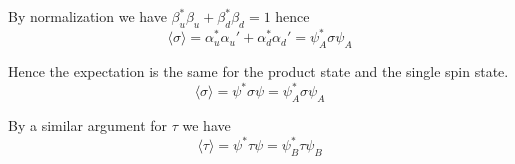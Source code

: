 \documentclass[12pt]{article}
\begin{document}
By normalization we have $\beta_u^*\beta_u+\beta_d^*\beta_d=1$ hence
\begin{equation*}
\langle\sigma\rangle=\alpha_u^*\alpha_u'+\alpha_d^*\alpha_d'=\psi_A^*\sigma\psi_A
\end{equation*}

Hence the expectation is the same for the product state and the single spin state.
\begin{equation*}
\langle\sigma\rangle=\psi^*\sigma\psi=\psi_A^*\sigma\psi_A
\end{equation*}

By a similar argument for $\tau$ we have
\begin{equation*}
\langle\tau\rangle=\psi^*\tau\psi=\psi_B^*\tau\psi_B
\end{equation*}
\end{document}
